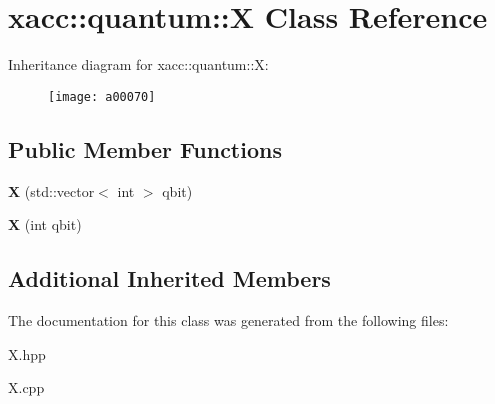 \hypertarget{a00070}{}\section{xacc\+:\+:quantum\+:\+:X Class Reference}
\label{a00070}
Inheritance diagram for xacc\+:\+:quantum\+:\+:X\+:\begin{figure}[H]
\begin{center}
\leavevmode
\texttt{[image: a00070]}
\end{center}
\end{figure}
\subsection*{Public Member Functions}
\begin{DoxyCompactItemize}
\item 
{\bfseries X} (std\+::vector$<$ int $>$ qbit)\hypertarget{a00070_aedc541a302602154847118f73b040510}{}\label{a00070_aedc541a302602154847118f73b040510}

\item 
{\bfseries X} (int qbit)\hypertarget{a00070_a1159bd01929b59277b4524ccfcfd7440}{}\label{a00070_a1159bd01929b59277b4524ccfcfd7440}

\end{DoxyCompactItemize}
\subsection*{Additional Inherited Members}


The documentation for this class was generated from the following files\+:\begin{DoxyCompactItemize}
\item 
X.\+hpp\item 
X.\+cpp\end{DoxyCompactItemize}
